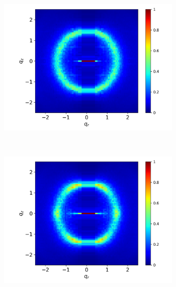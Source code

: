 \documentclass{article}
\begin{document}
  \begin{figure}
        \centering
        \begin{subfigure}{0.45\linewidth}
                \centering
                \includegraphics[width=\linewidth]{offset_disordered_rzplot.png}
                \caption{}~\label{fig:offset_disordered_xrd}
        \end{subfigure}%
        \begin{subfigure}{0.45\linewidth}
                \centering
                \includegraphics[width=\linewidth]{layered_disordered_rzplot.png}
                \caption{}~\label{fig:layered_disordered_xrd}
        \end{subfigure}
        \begin{subfigure}{0.45\linewidth}

\end{subfigure}
\end{figure}
\end{document}
